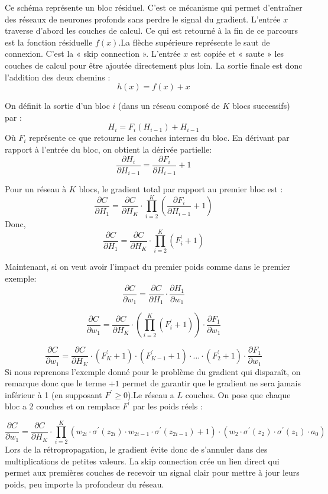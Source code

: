 \documentclass{rapportbrebeuf}
\begin{document}
Ce schéma représente un bloc résiduel. C'est ce mécanisme qui permet d'entraîner des réseaux de neurones profonds sans perdre le signal du gradient. L'entrée $x$ traverse d'abord les couches de calcul. Ce qui est retourné à la fin de ce parcours est la fonction résiduelle $f(x)$.La flèche supérieure représente le saut de connexion. C'est la « skip connection ». L'entrée $x$ est copiée et « saute » les couches de calcul pour être ajoutée directement plus loin. La sortie finale est donc l'addition des deux chemins :
\[ h(x) = f(x) + x \]

On définit la sortie d'un bloc $i$ (dans un réseau composé de $K$ blocs successifs) par :$$H_i = F_i(H_{i-1}) + H_{i-1}$$Où $F_i$ représente ce que retourne les couches internes du bloc. En dérivant par rapport à l'entrée du bloc, on obtient la dérivée partielle:
$$\frac{\partial H_i}{\partial H_{i-1}} = \frac{\partial F_i}{\partial H_{i-1}} + 1$$

Pour un réseau à $K$ blocs, le gradient total par rapport au premier bloc est :
$$\frac{\partial C}{\partial H_1} = \frac{\partial C}{\partial H_K} \cdot \prod_{i=2}^{K} \left( \frac{\partial F_i}{\partial H_{i-1}} + 1 \right)$$
Donc, 
$$\frac{\partial C}{\partial H_1} = \frac{\partial C}{\partial H_K} \cdot \prod_{i=2}^{K} (F^\prime_i + 1)$$

Maintenant, si on veut avoir l'impact du premier poids comme dans le premier exemple:
$$\frac{\partial C}{\partial w_1} = \frac{\partial C}{\partial H_1} \cdot \frac{\partial H_1}{\partial w_1}$$

$$\frac{\partial C}{\partial w_1} = \frac{\partial C}{\partial H_K} \cdot \left( \prod_{i=2}^{K} (F^\prime_i + 1) \right) \cdot \frac{\partial F_1}{\partial w_1}$$

$$ \frac{\partial C}{\partial w_1} = \frac{\partial C}{\partial H_K} \cdot (F^\prime_K + 1) \cdot (F^\prime_{K-1} + 1) \cdot \dots \cdot (F^\prime_2 + 1) \cdot \frac{\partial F_1}{\partial w_1} $$
Si nous reprenons l'exemple donné pour le problème du gradient qui disparaît, on remarque donc que le terme $+1$ permet de garantir que le gradient ne sera jamais inférieur à 1 (en supposant $F^\prime \geq 0$).Le réseau a $L$ couches. On pose que chaque bloc a 2 couches et on remplace $F^\prime$ par les poids réels :

$$ \frac{\partial C}{\partial w_1} = \frac{\partial C}{\partial H_K} \cdot \prod_{i=2}^{K} \left( w_{2i} \cdot \sigma^\prime(z_{2i}) \cdot w_{2i-1} \cdot \sigma^\prime(z_{2i-1}) + 1 \right) \cdot \left( w_2 \cdot \sigma^\prime(z_2) \cdot \sigma^\prime(z_1) \cdot a_0 \right) $$
Lors de la rétropropagation, le gradient évite donc de s'annuler dans des multiplications de petites valeurs. La skip connection crée un lien direct qui permet aux premières couches de recevoir un signal clair pour mettre à jour leurs poids, peu importe la profondeur du réseau.
\end{document}
